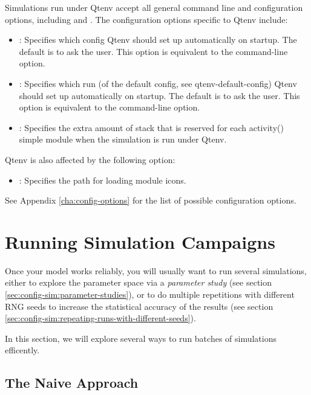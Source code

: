 Simulations run under Qtenv accept all general command line
and configuration options, including  and .
The configuration options specific to Qtenv include:

\begin{itemize}
  \item {}:
    Specifies which config Qtenv should set up automatically on
    startup. The default is to ask the user. This option is equivalent to the
     command-line option.

  \item {}: Specifies which run (of the default
    config, see qtenv-default-config) Qtenv should set up automatically on startup.
    The default is to ask the user. This option is equivalent to the 
    command-line option.

  \item {}:
    Specifies the extra amount of stack that is reserved for each activity()
    simple module when the simulation is run under Qtenv.
\end{itemize}

Qtenv is also affected by the following option:

\begin{itemize}
  \item {}: Specifies the path for loading module icons.
\end{itemize}

See Appendix \ref{cha:config-options} for the list of possible configuration options.


\section{Running Simulation Campaigns}
\label{sec:run-sim:simulation-campaigns}

Once your model works reliably, you will usually want to run several
simulations, either to explore the parameter space via a \textit{parameter
study} (see section \ref{sec:config-sim:parameter-studies}), or to do
multiple repetitions with different RNG seeds to increase the statistical
accuracy of the results (see section
\ref{sec:config-sim:repeating-runs-with-different-seeds}).

In this section, we will explore several ways to run batches of
simulations efficently.

\subsection{The Naive Approach}
\label{sec:run-sim:campaigns-naive-approach}

